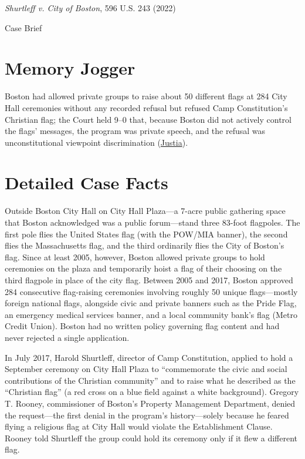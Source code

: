 \documentclass[12pt]{article}
\begin{document}
\begin{center}
{\LARGE \textit{Shurtleff v. City of Boston}, 596 U.S. 243 (2022)\par}
\vspace{0.8em}
{\large Case Brief\par}
\end{center}
\vspace{1em}

\section{Memory Jogger}
Boston had allowed private groups to raise about 50 different flags at 284 City Hall ceremonies without any recorded refusal but refused Camp Constitution's Christian flag; the Court held 9--0 that, because Boston did not actively control the flags' messages, the program was private speech, and the refusal was unconstitutional viewpoint discrimination (\href{https://supreme.justia.com/cases/federal/us/596/20-1800/}{Justia}).

\section{Detailed Case Facts}
Outside Boston City Hall on City Hall Plaza---a 7-acre public gathering space that Boston acknowledged was a public forum---stand three 83-foot flagpoles. The first pole flies the United States flag (with the POW/MIA banner), the second flies the Massachusetts flag, and the third ordinarily flies the City of Boston's flag. Since at least 2005, however, Boston allowed private groups to hold ceremonies on the plaza and temporarily hoist a flag of their choosing on the third flagpole in place of the city flag. Between 2005 and 2017, Boston approved 284 consecutive flag-raising ceremonies involving roughly 50 unique flags---mostly foreign national flags, alongside civic and private banners such as the Pride Flag, an emergency medical services banner, and a local community bank's flag (Metro Credit Union). Boston had no written policy governing flag content and had never rejected a single application.

In July 2017, Harold Shurtleff, director of Camp Constitution, applied to hold a September ceremony on City Hall Plaza to ``commemorate the civic and social contributions of the Christian community'' and to raise what he described as the ``Christian flag'' (a red cross on a blue field against a white background). Gregory T. Rooney, commissioner of Boston's Property Management Department, denied the request---the first denial in the program's history---solely because he feared flying a religious flag at City Hall would violate the Establishment Clause. Rooney told Shurtleff the group could hold its ceremony only if it flew a different flag.
\end{document}
